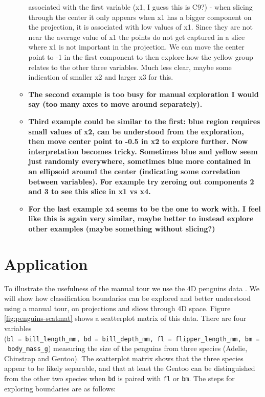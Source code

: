 \documentclass[]{interact}
\theoremstyle{plain}%
\theoremstyle{definition}
\theoremstyle{remark}
\begin{document}
\begin{itemize}
\begin{itemize}
{    associated with the first variable (x1, I guess this is C9?) - when
    slicing through the center it only appears when x1 has a bigger
    component on the projection, it is associated with low values of x1.
    Since they are not near the average value of x1 the points do not
    get captured in a slice where x1 is not important in the projection.
    We can move the center point to -1 in the first component to then
    explore how the yellow group relates to the other three variables.
    Much less clear, maybe some indication of smaller x2 and larger x3
    for this.}
  \item
    \textbf{The second example is too busy for manual exploration I
    would say (too many axes to move around separately).}
  \item
    \textbf{Third example could be similar to the first: blue region
    requires small values of x2, can be understood from the exploration,
    then move center point to -0.5 in x2 to explore further. Now
    interpretation becomes tricky. Sometimes blue and yellow seem just
    randomly everywhere, sometimes blue more contained in an ellipsoid
    around the center (indicating some correlation between variables).
    For example try zeroing out components 2 and 3 to see this slice in
    x1 vs x4.}
  \item
    \textbf{For the last example x4 seems to be the one to work with. I
    feel like this is again very similar, maybe better to instead
    explore other examples (maybe something without slicing?)}
  \end{itemize}
\end{itemize}

\hypertarget{sec:examples}{%
\section{Application}\label{sec:examples}}

To illustrate the usefulness of the manual tour we use the 4D penguins
data \citep{penguins}. We will show how classification boundaries can be
explored and better understood using a manual tour, on projections and
slices through 4D space. Figure \ref{fig:penguins-scatmat} shows a
scatterplot matrix of this data. There are four variables
(\texttt{bl\ =\ bill\_length\_mm,\ bd\ =\ bill\_depth\_mm,\ fl\ =\ flipper\_length\_mm,\ bm\ =\ body\_mass\_g})
measuring the size of the penguins from three species (Adelie, Chinstrap
and Gentoo). The scatterplot matrix shows that the three species appear
to be likely separable, and that at least the Gentoo can be
distinguished from the other two species when \texttt{bd} is paired with
\texttt{fl} or \texttt{bm}. The steps for exploring boundaries are as
follows:
\end{document}
